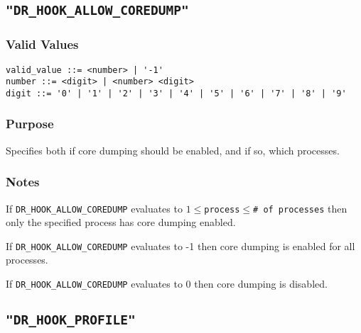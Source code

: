 

\subsection{\texttt{"DR\_HOOK\_ALLOW\_COREDUMP"}}
\label{section:flags:DR_HOOK_ALLOW_COREDUMP}
\vspace{-2ex}
\subsubsection{Valid Values}
\vspace{-2ex}
\verb+valid_value ::= <number> | '-1'+ \\
\verb+number ::= <digit> | <number> <digit>+ \\
\verb+digit ::= '0' | '1' | '2' | '3' | '4' | '5' | '6' | '7' | '8' | '9'+

\vspace{-2ex}
\subsubsection{Purpose}
\vspace{-2ex}
Specifies both if core dumping should be enabled, and if so, which processes.

\vspace{-2ex}
\subsubsection{Notes}
\vspace{-2ex}

If \texttt{DR\_HOOK\_ALLOW\_COREDUMP} evaluates to $1\leq$\texttt{process}$\leq$\texttt{\# of processes} then only the specified process has core dumping enabled.

If \texttt{DR\_HOOK\_ALLOW\_COREDUMP} evaluates to -1 then core dumping is enabled for all processes.

If \texttt{DR\_HOOK\_ALLOW\_COREDUMP} evaluates to 0 then core dumping is disabled.



\subsection{\texttt{"DR\_HOOK\_PROFILE"}}
\label{section:flags:DR_HOOK_PROFILE}
\vspace{-2ex}
